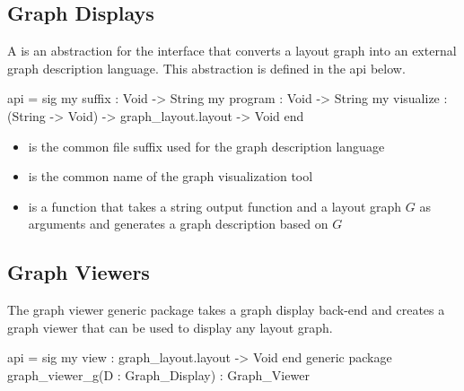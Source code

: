 \subsection{Graph Displays}

A  is an abstraction for the
interface that converts a layout graph into an external graph 
description language.  This abstraction is defined in the
api below.
\begin{SML}
 api  = sig
   my suffix    : Void -> String
   my program   : Void -> String
   my visualize : (String -> Void) -> graph_layout.layout -> Void
 end
\end{SML}
\begin{itemize}
\item {} is the common file suffix used for the graph description
language 
\item {} is the common name of the graph visualization tool
\item {} is a function that takes a 
string output function and a layout graph $G$ as arguments
and generates a graph description based on $G$
\end{itemize}

\subsection{Graph Viewers}

The graph viewer generic package 
takes a graph display back-end and creates a graph viewer
that can be used to display any layout graph.

\begin{SML}
 api  = sig
    my view : graph_layout.layout -> Void
 end
 generic package graph_viewer_g(D : Graph_Display) : Graph_Viewer
\end{SML}
